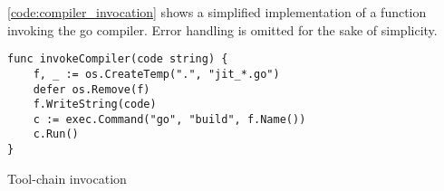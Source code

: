 \autoref{code:compiler_invocation} shows a simplified implementation of a
function invoking the go compiler. Error handling is omitted for the sake of
simplicity.

\begin{listing}[H]
    \begin{verbatim}
func invokeCompiler(code string) {
    f, _ := os.CreateTemp(".", "jit_*.go")
    defer os.Remove(f)
    f.WriteString(code)
    c := exec.Command("go", "build", f.Name())
    c.Run()
}
    \end{verbatim}
    \caption{Tool-chain invocation}
    \label{code:compiler_invocation}
\end{listing}

